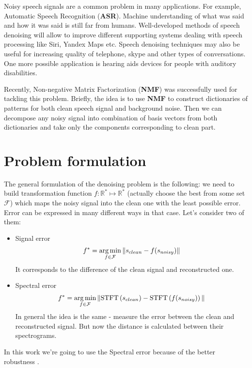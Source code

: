 \documentclass[11pt]{article}
\newcommand{\argmin}{\mathop{\rm arg\,min}\limits} %
\begin{document}
Noisy speech signals are a common problem in many applications. For example, Automatic Speech Recognition (\textbf{ASR}). Machine understanding of what was said and how it was said is still far from humans. Well-developed methods of speech denoising will allow to improve different supporting systems dealing with speech processing like Siri, Yandex Maps etc. Speech denoising techniques may also be useful for increasing quality of telephone, skype and other types of conversations. One more possible application is hearing aids devices for people with auditory disabilities.

Recently, Non-negative Matrix Factorization (\textbf{NMF}) was successfully used for tackling this problem. Briefly, the idea is to use \textbf{NMF} to construct dictionaries of patterns for both clean speech signal and background noise. Then we can decompose any noisy signal into combination of basis vectors from both dictionaries and take only the components corresponding to clean part.

\section{Problem formulation}

The general formulation of the denoising problem is the following: we need to build transformation function $f: \mathbb{R}^{*} \mapsto \mathbb{R}^*$ (actually choose the best from some set $\mathcal{F}$) which maps the noisy signal into the clean one with the least possible error. Error can be expressed in many different ways in that case. Let's consider two of them:
\begin{itemize}
\item Signal error
\begin{gather*}
f^* = \argmin_{f \in \mathcal{F}}\|s_{clean} - f(s_{noisy})\|
\end{gather*}
It corresponds to the difference of the clean signal and reconstructed one.
\item Spectral error
\begin{gather*}
f^* = \argmin_{f \in \mathcal{F}}\|\text{STFT}\left(s_{clean}\right) - \text{STFT}\left(f(s_{noisy})\right)\|
\end{gather*}
In general the idea is the same - measure the error between the clean and reconstructed signal. But now the distance is calculated between their spectrograms.
\end{itemize}
In this work we're going to use the Spectral error because of the better robustness \cite{hu}.
\end{document}
